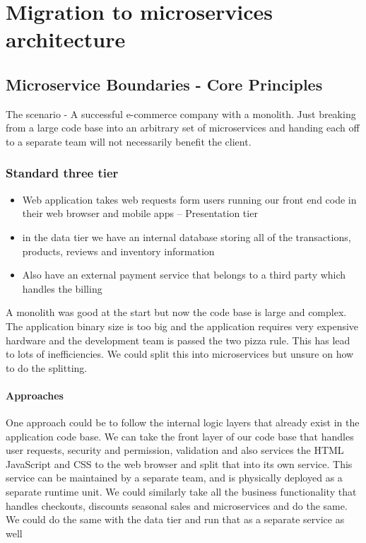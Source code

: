 \section{Migration to microservices architecture}

\subsection{Microservice Boundaries - Core Principles}
The scenario - A successful e-commerce company with a monolith.
Just breaking from a large code base into an arbitrary set of microservices and handing each off to a separate team will not necessarily benefit the client.

\subsubsection{Standard three tier}
\begin{itemize}
    \item Web application takes web requests form users running our front end code in their web browser and mobile apps -- Presentation tier
    \item in the data tier we have an internal database storing all of the transactions, products, reviews and inventory information
    \item Also have an external payment service that belongs to a third party which handles the billing
\end{itemize}

A monolith was good at the start but now the code base is large and complex.
The application binary size is too big and the application requires very expensive hardware and the development team is passed the two pizza rule.
This has lead to lots of inefficiencies.
We could split this into microservices but unsure on how to do the splitting.

\paragraph{Approaches}
One approach could be to follow the internal logic layers that already exist in the application code base.
We can take the front layer of our code base that handles user requests, security and permission, validation and also services the HTML JavaScript and CSS to the web browser and split that into its own service.
This service can be maintained by a separate team, and is physically deployed as a separate runtime unit.
We could similarly take all the business functionality that handles checkouts, discounts seasonal sales and microservices and do the same.
We could do the same with the data tier and run that as a separate service as well

